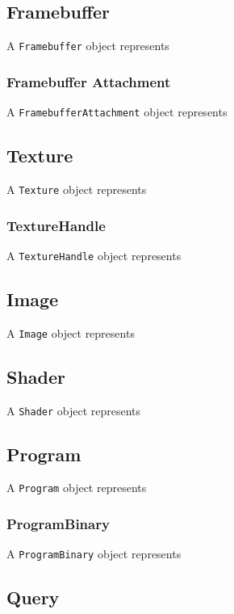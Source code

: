 \documentclass{article}
\begin{document}
\subsection{Framebuffer}

A \verb|Framebuffer| object represents 

\subsubsection{Framebuffer Attachment}

A \verb|FramebufferAttachment| object represents 

\subsection{Texture}

A \verb|Texture| object represents 

\subsubsection{TextureHandle}

A \verb|TextureHandle| object represents 

\subsection{Image}

A \verb|Image| object represents 

\subsection{Shader}

A \verb|Shader| object represents 

\subsection{Program}

A \verb|Program| object represents 

\subsubsection{ProgramBinary}

A \verb|ProgramBinary| object represents 

\subsection{Query}
\end{document}

